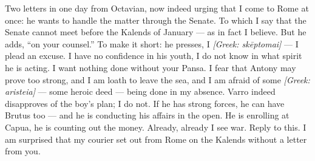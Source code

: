 

 Two letters in one day from Octavian, now indeed urging that I come to Rome at once: he wants to handle the matter through the Senate. To which I say that the Senate cannot meet before the Kalends of January --- as in fact I believe. But he adds, ``on your counsel.'' To make it short: he presses, I \textit{[Greek: skēptomai]} --- I plead an excuse. I have no confidence in his youth, I do not know in what spirit he is acting. I want nothing done without your Pansa. I fear that Antony may prove too strong, and I am loath to leave the sea, and I am afraid of some \textit{[Greek: aristeia]} --- some heroic deed --- being done in my absence. Varro indeed disapproves of the boy's plan; I do not. If he has strong forces, he can have Brutus too --- and he is conducting his affairs in the open. He is enrolling at Capua, he is counting out the money. Already, already I see war. Reply to this. I am surprised that my courier set out from Rome on the Kalends without a letter from you.
